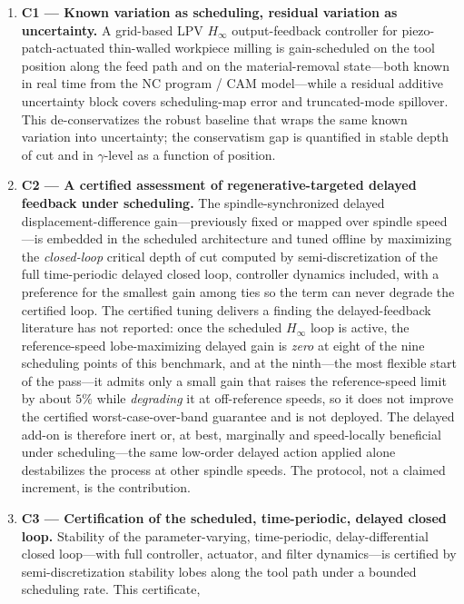 \documentclass[preprint,12pt]{elsarticle}
\newcommand{\hinf}{H_\infty}
\begin{document}
\begin{enumerate}
\item \textbf{C1 --- Known variation as scheduling, residual variation
as uncertainty.} A grid-based LPV $\hinf$ output-feedback controller for
piezo-patch-actuated thin-walled workpiece milling is gain-scheduled on
the tool position along the feed path and on the material-removal
state---both known in real time from the NC program / CAM model---while
a residual additive uncertainty block covers scheduling-map error and
truncated-mode spillover. This de-conservatizes the robust baseline
\cite{du2024robust} that wraps the same known variation into
uncertainty; the conservatism gap is quantified in stable depth of cut
and in $\gamma$-level as a function of position.
\item \textbf{C2 --- A certified assessment of regenerative-targeted
delayed feedback under scheduling.} The spindle-synchronized delayed
displacement-difference gain---previously fixed
\cite{du2022timedelay,dong2023suppress} or mapped over spindle speed
\cite{jmp2026spindle}---is embedded in the scheduled architecture and
tuned offline by maximizing the \emph{closed-loop} critical depth of
cut computed by semi-discretization of the full time-periodic delayed
closed loop, controller dynamics included, with a preference for the
smallest gain among ties so the term can never degrade the certified
loop. The certified tuning delivers a finding the delayed-feedback
literature has not reported: once the scheduled $\hinf$ loop is
active, the reference-speed lobe-maximizing delayed gain is \emph{zero}
at eight of the nine scheduling points of this benchmark, and at the
ninth---the most flexible start of the pass---it admits only a small
gain that raises the reference-speed limit by about $5\%$ while
\emph{degrading} it at off-reference speeds, so it does not improve the
certified worst-case-over-band guarantee and is not deployed. The
delayed add-on is therefore inert or, at best, marginally and
speed-locally beneficial under scheduling---the same low-order delayed
action applied alone destabilizes the process at other spindle speeds.
The protocol, not a claimed increment, is the contribution.
\item \textbf{C3 --- Certification of the scheduled, time-periodic,
delayed closed loop.} Stability of the parameter-varying, time-periodic,
delay-differential closed loop---with full controller, actuator, and
filter dynamics---is certified by semi-discretization stability lobes
along the tool path under a bounded scheduling rate. This certificate,

\end{enumerate}
\end{document}
